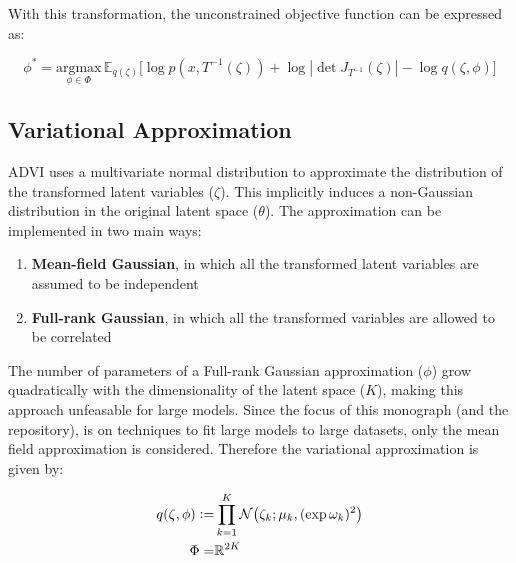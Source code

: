 \documentclass[10pt]{article}
\newcommand{\defeq}{\vcentcolon=}
\begin{document}
With this transformation, the unconstrained objective function can be expressed as:

\begin{equation*}
  \phi^* = \underset{\phi \in \Phi}{\text{argmax}} \, \mathbb{E}_{q(\zeta)}\big[\log p(x, T^{-1}(\zeta)) + \log |\det J_{T^{-1}}(\zeta)| - \log q(\zeta, \phi) \big]
\end{equation*}

\subsection*{Variational Approximation}

ADVI uses a multivariate normal distribution to approximate the distribution of the transformed latent variables ($\zeta$). This
implicitly induces a non-Gaussian distribution in the original latent space ($\theta$). The approximation can be implemented in
two main ways:

\begin{enumerate}
  \item \textbf{Mean-field Gaussian}, in which all the transformed latent variables are assumed to be independent
  \item \textbf{Full-rank Gaussian}, in which all the transformed variables are allowed to be correlated
\end{enumerate}

The number of parameters of a Full-rank Gaussian approximation ($\phi$) grow quadratically with the dimensionality of the 
latent space ($K$), making this approach unfeasable for large models. Since the focus of this monograph (and the repository),
is on techniques to fit large models to large datasets, only the mean field approximation is considered. Therefore the
variational approximation is given by:

\begin{align*}
  q(\zeta, \phi) \defeq& \prod_{k = 1}^{K}\mathcal{N}\big(\zeta_k; \mu_k, (\exp \omega_k)^2\big) \\
  \Phi =& \mathbb{R}^{2K}
\end{align*}
\end{document}
